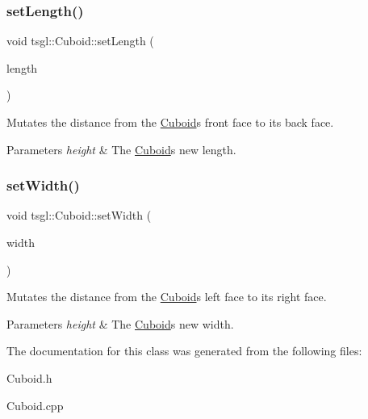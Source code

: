 \subsubsection{\texorpdfstring{set\+Length()}{setLength()}}
{\footnotesize\ttfamily void tsgl\+::\+Cuboid\+::set\+Length (\begin{DoxyParamCaption}\item[{G\+Lfloat}]{length }\end{DoxyParamCaption})\hspace{0.3cm}{\ttfamily [virtual]}}



Mutates the distance from the \hyperlink{classtsgl_1_1_cuboid}{Cuboid}\textquotesingle{}s front face to its back face. 


\begin{DoxyParams}{Parameters}
{\em height} & The \hyperlink{classtsgl_1_1_cuboid}{Cuboid}\textquotesingle{}s new length. \\
\hline
\end{DoxyParams}
\mbox{\label{classtsgl_1_1_cuboid_a1bb873bf2fb9a51996219e5c6b013520}} 
\subsubsection{\texorpdfstring{set\+Width()}{setWidth()}}
{\footnotesize\ttfamily void tsgl\+::\+Cuboid\+::set\+Width (\begin{DoxyParamCaption}\item[{G\+Lfloat}]{width }\end{DoxyParamCaption})\hspace{0.3cm}{\ttfamily [virtual]}}



Mutates the distance from the \hyperlink{classtsgl_1_1_cuboid}{Cuboid}\textquotesingle{}s left face to its right face. 


\begin{DoxyParams}{Parameters}
{\em height} & The \hyperlink{classtsgl_1_1_cuboid}{Cuboid}\textquotesingle{}s new width. \\
\hline
\end{DoxyParams}


The documentation for this class was generated from the following files\+:\begin{DoxyCompactItemize}
\item 
Cuboid.\+h\item 
Cuboid.\+cpp\end{DoxyCompactItemize}
